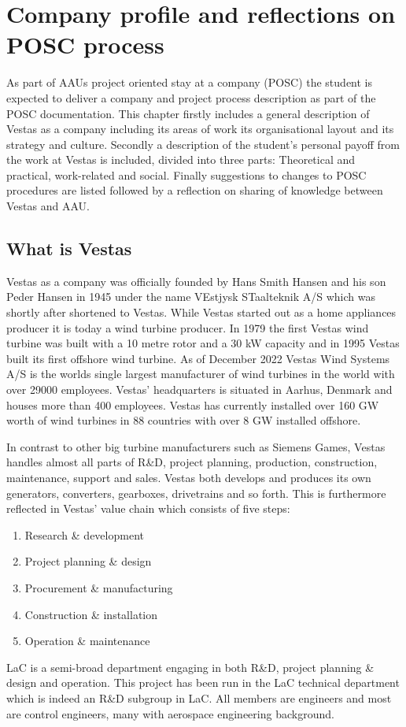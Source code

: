 \section{Company profile and reflections on POSC process} \label{company}
As part of AAUs project oriented stay at a company (POSC) the student is expected to deliver a company and project process description as part of the POSC documentation. This chapter firstly includes a general description of Vestas as a company including its areas of work its organisational layout and its strategy and culture. Secondly a description of the student's personal payoff from the work at Vestas is included, divided into three parts: Theoretical and practical, work-related and social. Finally suggestions to changes to POSC procedures are listed followed by a reflection on sharing of knowledge between Vestas and AAU.


\subsection{What is Vestas}
Vestas as a company was officially founded by Hans Smith Hansen and his son Peder Hansen in 1945 under the name VEstjysk STaalteknik A/S which was shortly after shortened to Vestas. While Vestas started out as a home appliances producer it is today a wind turbine producer. In 1979 the first Vestas wind turbine was built with a 10 metre rotor and a 30 kW capacity and in 1995 Vestas built its first offshore wind turbine. As of December 2022 Vestas Wind Systems A/S is the worlds single largest manufacturer of wind turbines in the world with over 29000 employees. Vestas' headquarters is situated in Aarhus, Denmark and houses more than 400 employees. Vestas has currently installed over 160 GW worth of wind turbines in 88 countries with over 8 GW installed offshore.

\smallskip
In contrast to other big turbine manufacturers such as Siemens Games, Vestas handles almost all parts of R\&D, project planning, production, construction, maintenance, support and sales. Vestas both develops and produces its own generators, converters, gearboxes, drivetrains and so forth. This is furthermore reflected in Vestas' value chain which consists of five steps:
\begin{enumerate}
	\item Research \& development
	\item Project planning \& design
	\item Procurement \& manufacturing
	\item Construction \& installation
	\item Operation \& maintenance
\end{enumerate}
LaC is a semi-broad department engaging in both R\&D, project planning \& design and operation. This project has been run in the LaC technical department which is indeed an R\&D subgroup in LaC. All members are engineers and most are control engineers, many with aerospace engineering background.

